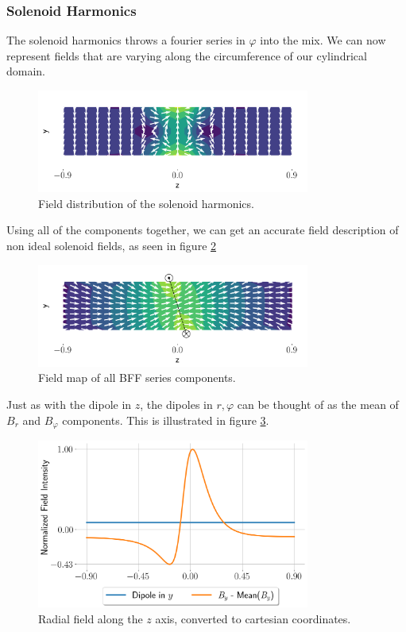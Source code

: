 \subsubsection{Solenoid Harmonics}
The solenoid harmonics throws a fourier series in
$\varphi$ into the mix. We can now represent fields that 
are varying along the circumference of our cylindrical domain.

\begin{figure}[!h]
    \centering
    \includegraphics[width=0.8\textwidth]{figs/solharm.png}
    \caption{Field distribution of the solenoid harmonics.}
    \label{fig:solharm}
\end{figure}

Using all of the components together, we can get an accurate
field description of non ideal solenoid fields, as seen in figure
\ref{fig:allharmonics}

\begin{figure}[!h]
    \centering
    \includegraphics[width=0.8\textwidth]{figs/allcomponents.png}
    \caption{Field map of all BFF series components.}
    \label{fig:allharmonics}
\end{figure}

Just as with the dipole in $z$, the dipoles in $r,\varphi$
can be thought of as the mean of $B_r$ and $B_\varphi$
components.
This is illustrated in figure \ref{fig:radialplot}.

\begin{figure}[!h]
    \centering
    \includegraphics[width=0.8\textwidth]{figs/radialplot.png}
    \caption{Radial field along the $z$ axis, converted
    to cartesian coordinates.}
    \label{fig:radialplot}
\end{figure}

